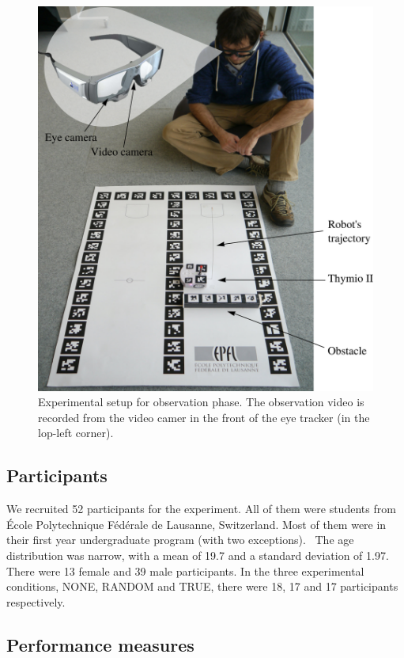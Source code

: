 \documentclass{sig-alternate}
\begin{document}
\begin{figure}
    \centering
    \includegraphics[width=0.9\linewidth]{setup}
    \caption{\small Experimental setup for observation phase. The observation
    video is recorded from the video camer in the front of the eye tracker (in
    the lop-left corner).}

    \label{expe}
\end{figure}

\subsection{Participants}

We recruited 52 participants for the experiment. All of them were
students from École Polytechnique Fédérale de Lausanne, Switzerland.
Most of them were in their first year undergraduate program (with two
exceptions). ~The age distribution was narrow, with a mean of 19.7 and a
standard deviation of 1.97. There were 13 female and 39 male
participants. In the three experimental conditions, NONE, RANDOM and
TRUE, there were 18, 17 and 17 participants respectively.

\subsection{Performance measures}
\end{document}
